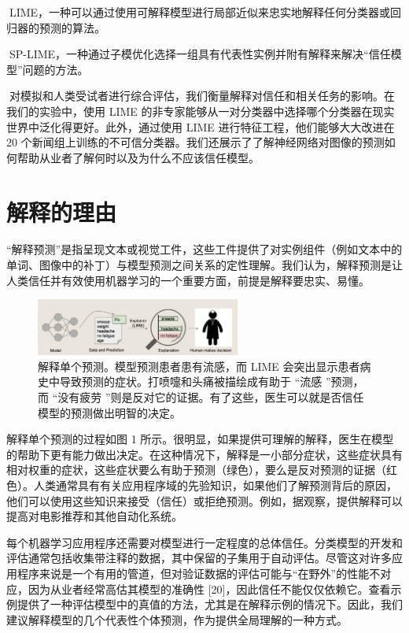 \documentclass[12pt, a4paper]{ctexart} %
\begin{document}
LIME，一种可以通过使用可解释模型进行局部近似来忠实地解释任何分类器或回归器的预测的算法。

SP-LIME，一种通过子模优化选择一组具有代表性实例并附有解释来解决“信任模型”问题的方法。

对模拟和人类受试者进行综合评估，我们衡量解释对信任和相关任务的影响。在我们的实验中，使用 LIME 的非专家能够从一对分类器中选择哪个分类器在现实世界中泛化得更好。此外，通过使用 LIME 进行特征工程，他们能够大大改进在 20 个新闻组上训练的不可信分类器。我们还展示了了解神经网络对图像的预测如何帮助从业者了解何时以及为什么不应该信任模型。

\section{解释的理由}
“解释预测”是指呈现文本或视觉工件，这些工件提供了对实例组件（例如文本中的单词、图像中的补丁）与模型预测之间关系的定性理解。我们认为，解释预测是让人类信任并有效使用机器学习的一个重要方面，前提是解释要忠实、易懂。

\begin{figure}[h]
    \centering
    \includegraphics[width=0.6\textwidth]{img/img_1.png}
    \caption{解释单个预测。模型预测患者患有流感，而 LIME 会突出显示患者病史中导致预测的症状。打喷嚏和头痛被描绘成有助于 “流感 ”预测，而 “没有疲劳 ”则是反对它的证据。有了这些，医生可以就是否信任模型的预测做出明智的决定。}
    \label{fig:img_1}
\end{figure}

解释单个预测的过程如图 1 所示。很明显，如果提供可理解的解释，医生在模型的帮助下更有能力做出决定。在这种情况下，解释是一小部分症状，这些症状具有相对权重的症状，这些症状要么有助于预测（绿色），要么是反对预测的证据（红色）。人类通常具有有关应用程序域的先验知识，如果他们了解预测背后的原因，他们可以使用这些知识来接受（信任）或拒绝预测。例如，据观察，提供解释可以提高对电影推荐和其他自动化系统。

每个机器学习应用程序还需要对模型进行一定程度的总体信任。分类模型的开发和评估通常包括收集带注释的数据，其中保留的子集用于自动评估。尽管这对许多应用程序来说是一个有用的管道，但对验证数据的评估可能与“在野外”的性能不对应，因为从业者经常高估其模型的准确性 [20]，因此信任不能仅仅依赖它。查看示例提供了一种评估模型中的真值的方法，尤其是在解释示例的情况下。因此，我们建议解释模型的几个代表性个体预测，作为提供全局理解的一种方式。
\end{document}
